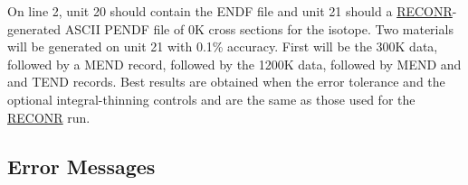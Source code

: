 \noindent   On line 2, unit 20 should contain the ENDF file and
unit 21 should a \hyperlink{sRECONRhy}{RECONR}-generated ASCII
PENDF file of 0K cross sections for the
isotope.  Two materials will be generated on unit 21 with 0.1\%
accuracy.  First will be the 300K data, followed by a MEND record,
followed by the 1200K data, followed by MEND and and TEND records.
Best results are obtained when the error tolerance 
and the optional integral-thinning controls 
and  are the same as those used for the
\hyperlink{sRECONRhy}{RECONR} run.

\subsection{Error Messages}
\label{ssCROADR_msg}

